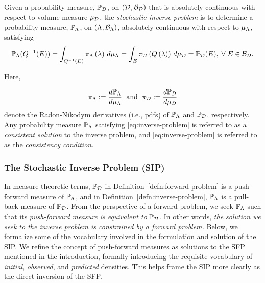 \begin{defn}\label{defn:inverse-problem}
  Given a probability measure, $\mathbb{P}_{\mathcal{D}}$, on $(\mathcal{D}, \mathcal{B}_{\mathcal{D}})$ that is absolutely continuous with respect to volume measure $\mu_{\mathcal{D}}$, the \emph{stochastic inverse problem} is to determine a probability measure, $\mathbb{P}_{\Lambda}$, on $({\Lambda}, \mathcal{B}_{{\Lambda}})$, absolutely continuous with respect to $\mu_{{\Lambda}}$, satisfying
  \begin{equation}\label{eq:inverse-problem}
    \mathbb{P}_{\Lambda} (Q^{-1}(E)) = \int_{Q^{-1}(E)} \pi_{\Lambda} \left ( \lambda \right ) \, d\mu_{{\Lambda}} = \int_E \pi_{\mathcal{D}} \left ( Q\left ( \lambda \right ) \right ) \, d\mu_{\mathcal{D}} = \mathbb{P}_{\mathcal{D}}(E), \; \forall \; E \in \mathcal{B}_{\mathcal{D}}.
  \end{equation}

  \noindent Here,

  \begin{equation*}
    \pi_{\Lambda} := \frac{d\mathbb{P}_{\Lambda}}{d\mu_{{\Lambda}}} \;\text{ and }\; \pi_{\mathcal{D}} := \frac{d\mathbb{P}_{\mathcal{D}}}{d\mu_{\mathcal{D}}}
  \end{equation*}
  denote the Radon-Nikodym derivatives (i.e., pdfs) of $\mathbb{P}_{\Lambda}$ and $\mathbb{P}_{\mathcal{D}}$, respectively.
  Any probability measure $\mathbb{P}_{\Lambda}$ satisfying \eqref{eq:inverse-problem} is referred to as a \emph{consistent solution} to the inverse problem, and \eqref{eq:inverse-problem} is referred to as the \emph{consistency condition}.
\end{defn}

\subsubsection{The Stochastic Inverse Problem (SIP)}

In measure-theoretic terms, $\mathbb{P}_{\mathcal{D}}$ in Definition~\ref{defn:forward-problem} is a push-forward measure of $\mathbb{P}_{\Lambda}$, and in Definition~\ref{defn:inverse-problem}, $\mathbb{P}_{\Lambda}$ is a pull-back measure of $\mathbb{P}_{\mathcal{D}}$.
From the perspective of a forward problem, we seek $\mathbb{P}_{\Lambda}$ such that its \emph{push-forward measure is equivalent to} $\mathbb{P}_{\mathcal{D}}$.
In other words, \emph{the solution we seek to the inverse problem is constrained by a forward problem.}
Below, we formalize some of the vocabulary involved in the formulation and solution of the SIP.
We refine the concept of push-forward measures as solutions to the SFP mentioned in the introduction, formally introducing the requisite vocabulary of \emph{initial}, \emph{observed}, and \emph{predicted} densities.
This helps frame the SIP more clearly as the direct inversion of the SFP.

